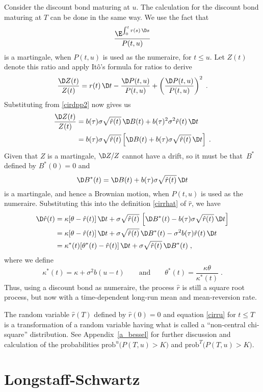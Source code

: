 Consider the discount bond maturing at $u$.  The calculation for the discount bond maturing at $T$ can be done in the same way.  We use the fact that
$$\frac{\E^{\int_0^t r(s)\,\D s}}{P(t,u)}$$
is a martingale, when $P(t,u)$ is used as the numeraire, for $t \leq u$.  Let $Z(t)$ denote this ratio and apply It\^o's formula for ratios to derive
$$\frac{\D Z(t)}{Z(t)} = r(t)\,\D t - \frac{\D P(t,u)}{P(t,u)} + \left(\frac{\D P(t,u)}{P(t,u)}\right)^2\; .$$
Substituting from \eqref{cirdpp2} now gives us
\begin{align*}
\frac{\D Z(t)}{Z(t)} &= b(\tau)\sigma\sqrt{\hat{r}(t)}\,\D B(t) + b(\tau)^2\sigma^2\hat{r}(t)\,\D t\\
&= b(\tau)\sigma\sqrt{\hat{r}(t)}\left[\D B(t) + b(\tau)\sigma\sqrt{\hat{r}(t)}\,\D t\right]\;.
\end{align*}
Given that $Z$ is a martingale, $\D Z/Z$ cannot have a drift, so it must be that~$B^*$ defined by $B^*(0)=0$ and
$$\D B^*(t) = \D B(t) + b(\tau)\sigma\sqrt{\hat{r}(t)}\,\D t$$
is a martingale, and hence a Brownian motion, when $P(t,u)$ is used as the numeraire.  Substituting this into the definition \eqref{cirrhat} of $\hat{r}$, we have
\begin{align}
\D \hat{r}(t)&=\kappa [\theta-\hat{r}(t)]\,\D t+\sigma \sqrt{\hat{r}(t)}\,\left[\D B^*(t) - b(\tau)\sigma\sqrt{\hat{r}(t)}\,\D t\right]\notag\\
&= \kappa [\theta-\hat{r}(t)]\,\D t+\sigma \sqrt{\hat{r}(t)}\,\D B^*(t) - \sigma^2b(\tau)\hat{r}(t)\,\D t\notag\\
&= \kappa^*(t)[\theta^*(t)-\hat{r}(t)]\,\D t +\sigma \sqrt{\hat{r}(t)}\,\D B^*(t)\;,\label{cirru}
\end{align}
where we define
$$
\kappa^*(t) = \kappa + \sigma^2b(u-t) \qquad \text{and} \qquad \theta^*(t) = \frac{\kappa\theta}{\kappa^*(t)}\; .$$
Thus, using a discount bond as numeraire, the process $\hat{r}$ is still a square root process, but now with a time-dependent long-run mean and  mean-reversion rate.  

The random variable $\hat{r}(T)$ defined by $\hat{r}(0)=0$ and equation \eqref{cirru} for $t \leq T$ is a transformation of a random variable having what is called a ``non-central chi-square'' distribution.  See Appendix~\ref{a_bessel} for further discussion and calculation of the probabilities $\text{prob}^u\big(P(T,u)>K\big)$ and $\text{prob}^T\big(P(T,u)>K\big)$. 


\section{Longstaff-Schwartz}\label{s_ls}


